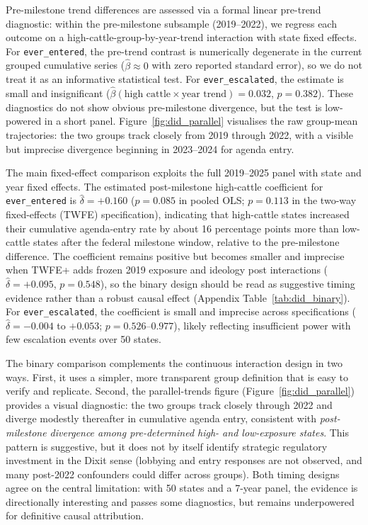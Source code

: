 \documentclass[12pt]{article}
\begin{document}
\begin{appendices}
Pre-milestone trend differences are assessed via a formal linear pre-trend diagnostic: within the pre-milestone subsample (2019--2022), we regress each outcome on a high-cattle-group-by-year-trend interaction with state fixed effects.  For \texttt{ever\_entered}, the pre-trend contrast is numerically degenerate in the current grouped cumulative series ($\hat{\beta} \approx 0$ with zero reported standard error), so we do not treat it as an informative statistical test.  For \texttt{ever\_escalated}, the estimate is small and insignificant ($\hat{\beta}(\text{high cattle} \times \text{year trend}) = 0.032$, $p = 0.382$).  These diagnostics do not show obvious pre-milestone divergence, but the test is low-powered in a short panel.  Figure~\ref{fig:did_parallel} visualises the raw group-mean trajectories: the two groups track closely from 2019 through 2022, with a visible but imprecise divergence beginning in 2023--2024 for agenda entry.

The main fixed-effect comparison exploits the full 2019--2025 panel with state and year fixed effects.  The estimated post-milestone high-cattle coefficient for \texttt{ever\_entered} is $\hat{\delta} = +0.160$ ($p = 0.085$ in pooled OLS; $p = 0.113$ in the two-way fixed-effects (TWFE) specification), indicating that high-cattle states increased their cumulative agenda-entry rate by about 16 percentage points more than low-cattle states after the federal milestone window, relative to the pre-milestone difference.  The coefficient remains positive but becomes smaller and imprecise when TWFE+ adds frozen 2019 exposure and ideology post interactions ($\hat{\delta}=+0.095$, $p=0.548$), so the binary design should be read as suggestive timing evidence rather than a robust causal effect (Appendix Table~\ref{tab:did_binary}).  For \texttt{ever\_escalated}, the coefficient is small and imprecise across specifications ($\hat{\delta}=-0.004$ to $+0.053$; $p=0.526$--$0.977$), likely reflecting insufficient power with few escalation events over 50 states.

The binary comparison complements the continuous interaction design in two ways.  First, it uses a simpler, more transparent group definition that is easy to verify and replicate.  Second, the parallel-trends figure (Figure~\ref{fig:did_parallel}) provides a visual diagnostic: the two groups track closely through 2022 and diverge modestly thereafter in cumulative agenda entry, consistent with \emph{post-milestone divergence among pre-determined high- and low-exposure states}.  This pattern is suggestive, but it does not by itself identify strategic regulatory investment in the Dixit sense (lobbying and entry responses are not observed, and many post-2022 confounders could differ across groups).  Both timing designs agree on the central limitation: with 50 states and a 7-year panel, the evidence is directionally interesting and passes some diagnostics, but remains underpowered for definitive causal attribution.


\end{appendices}
\end{document}
